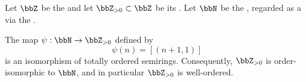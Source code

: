 \begin{proposition} \label{proposition:positive_integers_correspond_to_natural_numbers}
    Let $\bbZ$ be the  and let $\bbZ_{> 0} \subset \bbZ$ be its . Let $\bbN$ be the , regarded as a  via the .

    The map $\psi: \bbN \to \bbZ_{> 0}$ defined by
    $$\psi(n) = [(n+1, 1)]$$
    is an isomorphism of totally ordered semirings. Consequently, $\bbZ_{> 0}$ is order-isomorphic to $\bbN$, and in particular $\bbZ_{> 0}$ is well-ordered.
\end{proposition}

